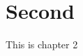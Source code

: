 \documentclass[../main]{subfiles}
\begin{document}
\chapter{Second}
\label{chap:second}

This is chapter 2

\lipsum[1-5]
\end{document}
